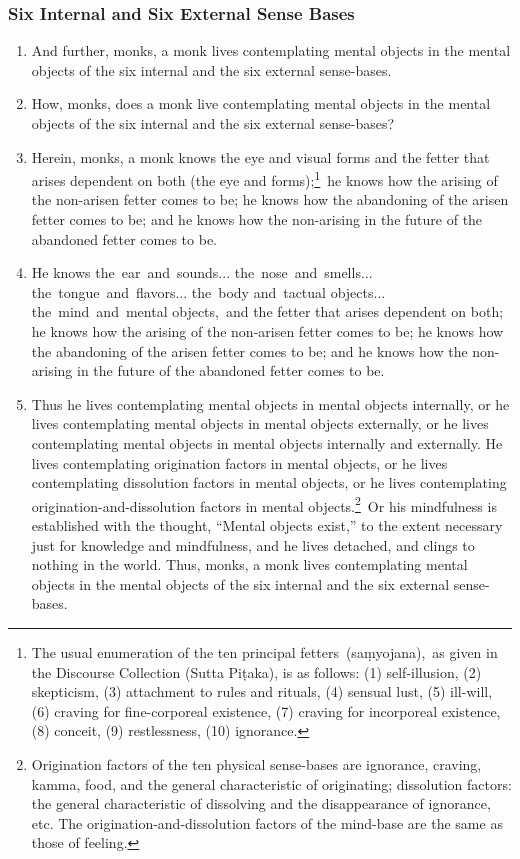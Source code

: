\subsubsection*{Six Internal and Six External Sense Bases}
\begin{enumerate}[resume]
\item And further, monks, a monk lives contemplating mental objects in the mental objects of the six internal and the six external sense-bases.
\item How, monks, does a monk live contemplating mental objects in the mental objects of the six internal and the six external sense-bases?
\item Herein, monks, a monk knows the eye and visual forms and the fetter that arises dependent on both (the eye and forms);\footnote{The usual enumeration of the ten principal fetters (saṃyojana), as given in the Discourse Collection (Sutta Piṭaka), is as follows: (1) self-illusion, (2) skepticism, (3) attachment to rules and rituals, (4) sensual lust, (5) ill-will, (6) craving for fine-corporeal existence, (7) craving for incorporeal existence, (8) conceit, (9) restlessness, (10) ignorance.} he knows how the arising of the non-arisen fetter comes to be; he knows how the abandoning of the arisen fetter comes to be; and he knows how the non-arising in the future of the abandoned fetter comes to be.
\item He knows the ear and sounds... the nose and smells... the tongue and flavors... the body and tactual objects... the mind and mental objects, and the fetter that arises dependent on both; he knows how the arising of the non-arisen fetter comes to be; he knows how the abandoning of the arisen fetter comes to be; and he knows how the non-arising in the future of the abandoned fetter comes to be.
\pagebreak
\item Thus he lives contemplating mental objects in mental objects internally, or he lives contemplating mental objects in mental objects externally, or he lives contemplating mental objects in mental objects internally and externally. He lives contemplating origination factors in mental objects, or he lives contemplating dissolution factors in mental objects, or he lives contemplating origination-and-dissolution factors in mental objects.\footnote{Origination factors of the ten physical sense-bases are ignorance, craving, kamma, food, and the general characteristic of originating; dissolution factors: the general characteristic of dissolving and the disappearance of ignorance, etc. The origination-and-dissolution factors of the mind-base are the same as those of feeling.} Or his mindfulness is established with the thought, “Mental objects exist,” to the extent necessary just for knowledge and mindfulness, and he lives detached, and clings to nothing in the world. Thus, monks, a monk lives contemplating mental objects in the mental objects of the six internal and the six external sense-bases.
\end{enumerate}
